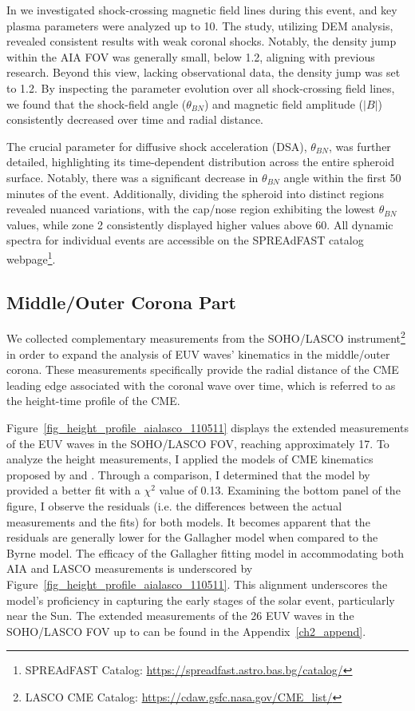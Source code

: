 In \citet{kozarev_2022} we investigated shock-crossing magnetic field lines during this event, and key plasma parameters were analyzed up to 10\rsun. The study, utilizing DEM analysis, revealed consistent results with weak coronal shocks. Notably, the density jump within the AIA FOV was generally small, below 1.2, aligning with previous research. Beyond this view, lacking observational data, the density jump was set to 1.2.
By inspecting the parameter evolution over all shock-crossing field lines, we found that the shock-field angle ($\theta_{BN}$) and magnetic field amplitude ($|B|$) consistently decreased over time and radial distance.

The crucial parameter for diffusive shock acceleration (DSA), $\theta_{BN}$, was further detailed, highlighting its time-dependent distribution across the entire spheroid surface. Notably, there was a significant decrease in $\theta_{BN}$ angle within the first 50 minutes of the event. Additionally, dividing the spheroid into distinct regions revealed nuanced variations, with the cap/nose region exhibiting the lowest $\theta_{BN}$ values, while zone 2 consistently displayed higher values above 60\degree. All dynamic spectra for individual events are accessible on the SPREAdFAST catalog webpage\footnote{SPREAdFAST Catalog: \url{https://spreadfast.astro.bas.bg/catalog/}}.

\subsection{Middle/Outer Corona Part}
We collected complementary measurements from the SOHO/LASCO instrument\footnote{LASCO CME Catalog: \url{https://cdaw.gsfc.nasa.gov/CME_list/}} in order to expand the analysis of EUV waves' kinematics in the middle/outer corona. These measurements specifically provide the radial distance of the CME leading edge associated with the coronal wave over time, which is referred to as the height-time profile of the CME.

Figure~\ref{fig_height_profile_aialasco_110511} displays the extended measurements of the EUV waves in the SOHO/LASCO FOV, reaching approximately 17\rsun. To analyze the height measurements, I applied the models of CME kinematics proposed by \citet{gallagher_2003} and \citet{byrne_2013}. Through a comparison, I determined that the model by \citet{gallagher_2003} provided a better fit with a $\chi^2$ value of 0.13. Examining the bottom panel of the figure, I observe the residuals (i.e. the differences between the actual measurements and the fits) for both models. It becomes apparent that the residuals are generally lower for the Gallagher model when compared to the Byrne model.
The efficacy of the Gallagher fitting model in accommodating both AIA and LASCO measurements is underscored by Figure~\ref{fig_height_profile_aialasco_110511}. This alignment underscores the model's proficiency in capturing the early stages of the solar event, particularly near the Sun. The extended measurements of the 26 EUV waves in the SOHO/LASCO FOV up to  \rsun can be found in the Appendix~\ref{ch2_append}.

